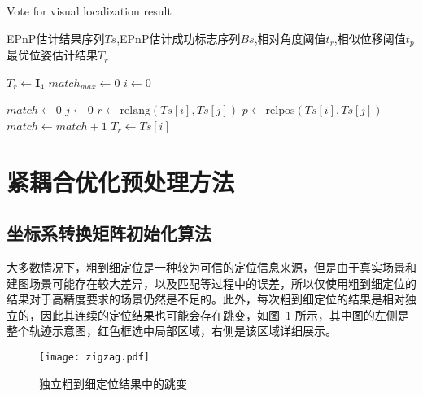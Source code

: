 \renewcommand{\algorithmicrequire}{\textbf{输入：}\unskip}
\renewcommand{\algorithmicensure}{\textbf{输出：}\unskip}
\begin{algorithm}
  \caption{Vote for visual localization result}
  \label{alg2}
  \small
  \begin{algorithmic}[1]
    \REQUIRE EPnP估计结果序列$Ts$,EPnP估计成功标志序列$Bs$,相对角度阈值$t_r$,相似位移阈值$t_p$
    \ENSURE 最优位姿估计结果$T_{r}$

    \STATE $T_{r} \leftarrow \symbf{I}_4$
    \STATE ${match}_{max} \leftarrow 0$
    \STATE $i \leftarrow 0$

      \STATE $match \leftarrow 0$
        \STATE $j \leftarrow 0$
          \STATE $r \leftarrow \text{relang}(Ts[i], Ts[j])$
          \STATE $p \leftarrow \text{relpos}(Ts[i], Ts[j])$
            \STATE $match \leftarrow match + 1$
          \ENDIF
        \ENDWHILE
          \STATE $T_{r} \leftarrow Ts[i]$
        \ENDIF
      \ENDIF
    \ENDWHILE
  \end{algorithmic}
\end{algorithm}

\section{紧耦合优化预处理方法}
\subsection{坐标系转换矩阵初始化算法}

大多数情况下，粗到细定位是一种较为可信的定位信息来源，但是由于真实场景和建图场景可能存在较大差异，以及匹配等过程中的误差，所以仅使用粗到细定位的结果对于高精度要求的场景仍然是不足的。此外，每次粗到细定位的结果是相对独立的，因此其连续的定位结果也可能会存在跳变，如图~\ref{fig:zigzag} 所示，其中图的左侧是整个轨迹示意图，红色框选中局部区域，右侧是该区域详细展示。

\begin{figure}
  \centering
  \texttt{[image: zigzag.pdf]}
  \caption{独立粗到细定位结果中的跳变}
  \label{fig:zigzag}
\end{figure}

